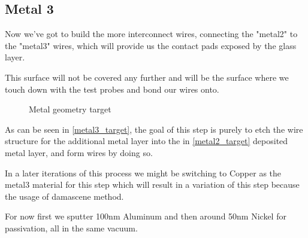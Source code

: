 \subsection{Metal 3}\label{chapter_metal3}

Now we've got to build the more interconnect wires, connecting the "metal2" to the "metal3" wires,
which will provide us the contact pads exposed by the glass layer.

This surface will not be covered any further and will be the surface where we touch down with the test
probes and bond our wires onto.

\begin{figure}[H]
	\centering
	\begin{tikzpicture}[node distance = 3cm, auto, thick,scale=\CrossAndTopSectionBig, every node/.style={transform shape}]
		
	\end{tikzpicture}
	\caption{Metal geometry target}
	\label{metal3_target}
\end{figure}

As can be seen in \autoref{metal3_target}, the goal of this step is purely to etch the wire structure for the additional
metal layer into the in \autoref{metal2_target} deposited metal layer, and form wires by doing so.

In a later iterations of this process we might be switching to Copper as the metal3 material for this step which
will result in a variation of this step because the usage of damascene method.

For now first we sputter 100nm Aluminum and then around 50nm Nickel for passivation, all in the same vacuum.
